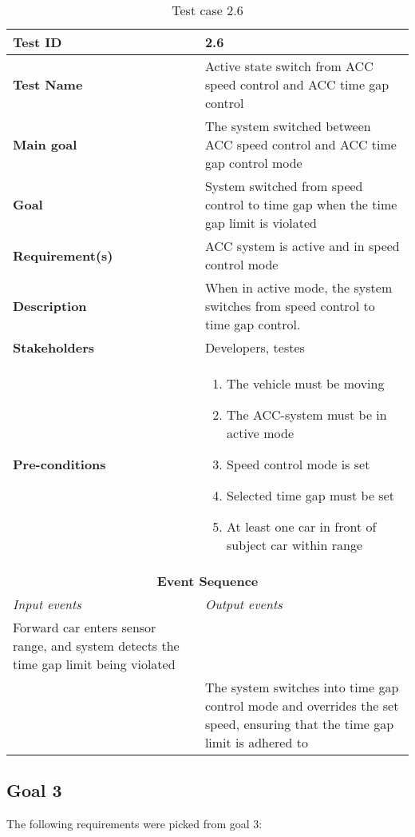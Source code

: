 \begin{table}[H]
\centering
\begin{tabularx}{\linewidth}{X|X}
    \hline
    \textbf{Test ID} & 2.6 \\
    \hline
    \textbf{Test Name} & Active state switch from ACC speed control and ACC time gap control  \\
    \hline
    \textbf{Main goal} & The system switched between ACC speed control and ACC time gap control mode  \\
    \hline
    \textbf{Goal} & System switched from speed control to time gap when the time gap limit is violated\\
    \hline
    \textbf{Requirement(s)} & ACC system is active and in speed control mode\\
    \hline
    \textbf{Description} & When in active mode, the system switches from speed control to time gap control.\\
    \hline
    \textbf{Stakeholders} & Developers, testes \\
    \hline
    \textbf{Pre-conditions} & 
    \begin{enumerate}
        \item The vehicle must be moving
        \item The ACC-system must be in active mode
        \item Speed control mode is set
        \item Selected time gap must be set
        \item At least one car in front of subject car within range
    \end{enumerate}\\
    \hline
    \multicolumn{2}{c}{\textbf{Event Sequence}} \\
    \hline
    \textit{Input events} & \textit{Output events} \\
    \hline
    Forward car enters sensor range, and system detects the time gap limit being violated &  \\
    \hline
     & The system switches into time gap control mode and overrides the set speed, ensuring that the time gap limit is adhered to\\
    \hline
\end{tabularx}
\caption{\label{tab_case2_6} Test case 2.6}
\end{table}

\newpage
\subsection{Goal 3}
The following requirements were picked from goal 3:

